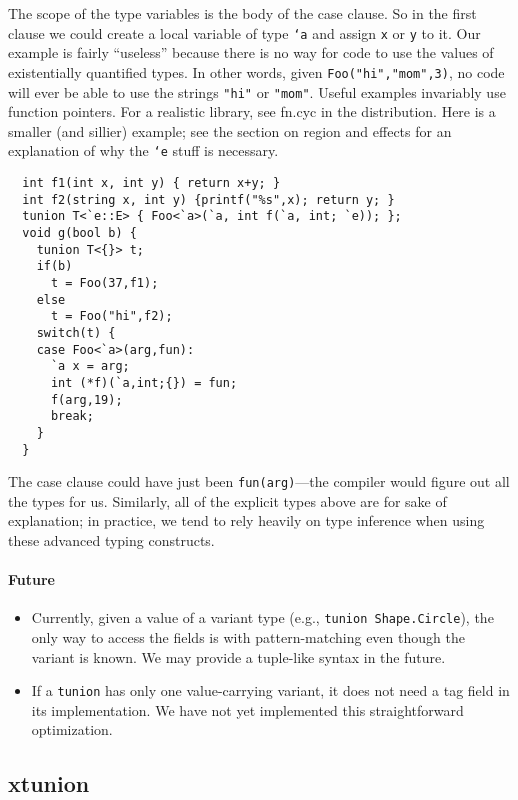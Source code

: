 The scope of the type variables is the body of the case clause.  So in
the first clause we could create a local variable of type \texttt{`a}
and assign \texttt{x} or \texttt{y} to it.  Our example is fairly
``useless'' because there is no way for code to use the values of
existentially quantified types.  In other words, given
\texttt{Foo("hi","mom",3)}, no code will ever be able to use the strings
\texttt{"hi"} or \texttt{"mom"}.  Useful examples invariably use function
pointers.  For a realistic library, see fn.cyc in the distribution.
Here is a smaller (and sillier) example; see the section on region and
effects for an explanation of why the \texttt{`e} stuff is necessary.
\begin{verbatim}
  int f1(int x, int y) { return x+y; }
  int f2(string x, int y) {printf("%s",x); return y; }
  tunion T<`e::E> { Foo<`a>(`a, int f(`a, int; `e)); };
  void g(bool b) {
    tunion T<{}> t;
    if(b)
      t = Foo(37,f1);
    else
      t = Foo("hi",f2);
    switch(t) {
    case Foo<`a>(arg,fun):
      `a x = arg;
      int (*f)(`a,int;{}) = fun;
      f(arg,19);
      break;
    }
  }
\end{verbatim}

The case clause could have just been \texttt{fun(arg)}---the compiler
would figure out all the types for us.  Similarly, all of the explicit
types above are for sake of explanation; in practice, we tend to rely
heavily on type inference when using these advanced typing constructs.

\paragraph{Future}
\begin{itemize}
\item Currently, given a value of a variant type (e.g.,
  \texttt{tunion Shape.Circle}), the only way to access the fields is
  with pattern-matching even though the variant is known.  We may
  provide a tuple-like syntax in the future.
\item If a \texttt{tunion} has only one value-carrying variant, it does
  not need a tag field in its implementation.  We have not yet
  implemented this straightforward optimization.
\end{itemize}

\subsection{xtunion}\hypertarget{xtunion_sec}{}


